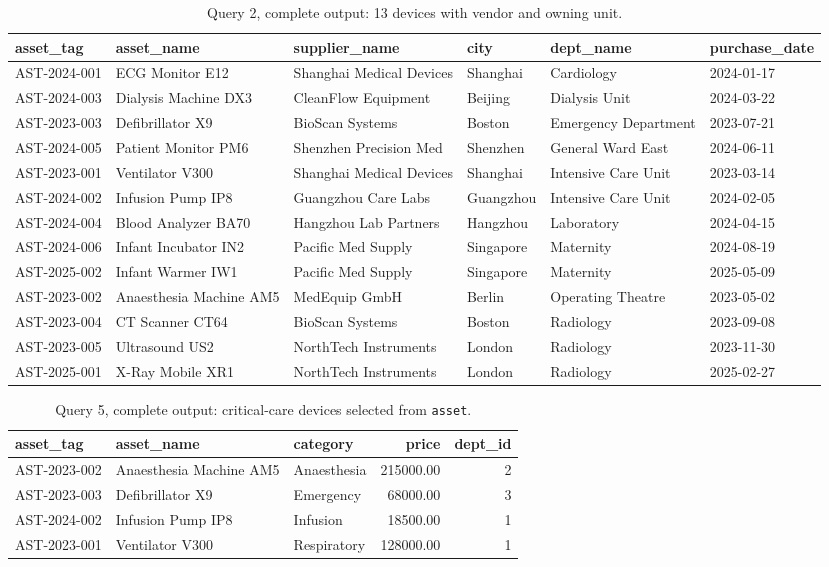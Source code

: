 \documentclass[conference]{IEEEtran}
\begin{document}
\begin{table}[!t]
\caption{Query 2, complete output: 13 devices with vendor and owning unit.}
\label{tab:q2full}
\centering
\footnotesize
\begin{tabular}{llllll}
\toprule
asset\_tag & asset\_name & supplier\_name & city & dept\_name & purchase\_date \\
\midrule
AST-2024-001 & ECG Monitor E12 & Shanghai Medical Devices & Shanghai & Cardiology & 2024-01-17 \\
AST-2024-003 & Dialysis Machine DX3 & CleanFlow Equipment & Beijing & Dialysis Unit & 2024-03-22 \\
AST-2023-003 & Defibrillator X9 & BioScan Systems & Boston & Emergency Department & 2023-07-21 \\
AST-2024-005 & Patient Monitor PM6 & Shenzhen Precision Med & Shenzhen & General Ward East & 2024-06-11 \\
AST-2023-001 & Ventilator V300 & Shanghai Medical Devices & Shanghai & Intensive Care Unit & 2023-03-14 \\
AST-2024-002 & Infusion Pump IP8 & Guangzhou Care Labs & Guangzhou & Intensive Care Unit & 2024-02-05 \\
AST-2024-004 & Blood Analyzer BA70 & Hangzhou Lab Partners & Hangzhou & Laboratory & 2024-04-15 \\
AST-2024-006 & Infant Incubator IN2 & Pacific Med Supply & Singapore & Maternity & 2024-08-19 \\
AST-2025-002 & Infant Warmer IW1 & Pacific Med Supply & Singapore & Maternity & 2025-05-09 \\
AST-2023-002 & Anaesthesia Machine AM5 & MedEquip GmbH & Berlin & Operating Theatre & 2023-05-02 \\
AST-2023-004 & CT Scanner CT64 & BioScan Systems & Boston & Radiology & 2023-09-08 \\
AST-2023-005 & Ultrasound US2 & NorthTech Instruments & London & Radiology & 2023-11-30 \\
AST-2025-001 & X-Ray Mobile XR1 & NorthTech Instruments & London & Radiology & 2025-02-27 \\
\bottomrule
\end{tabular}
\end{table}

\begin{table}[!t]
\caption{Query 5, complete output: critical-care devices selected from \texttt{asset}.}
\label{tab:q5full}
\centering
\footnotesize
\begin{tabular}{lllrr}
\toprule
asset\_tag & asset\_name & category & price & dept\_id \\
\midrule
AST-2023-002 & Anaesthesia Machine AM5 & Anaesthesia & 215000.00 & 2 \\
AST-2023-003 & Defibrillator X9 & Emergency & 68000.00 & 3 \\
AST-2024-002 & Infusion Pump IP8 & Infusion & 18500.00 & 1 \\
AST-2023-001 & Ventilator V300 & Respiratory & 128000.00 & 1 \\
\bottomrule
\end{tabular}
\end{table}
\end{document}
